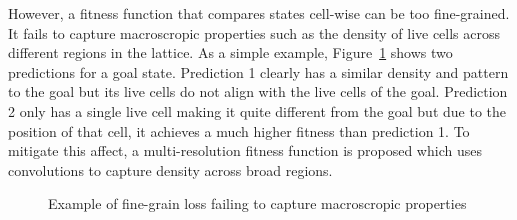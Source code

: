However, a fitness function that compares states cell-wise can be too fine-grained. It fails to capture macroscropic properties such as the density of live cells across different regions in the lattice. As a simple example, Figure~\ref{fig:singleres-fail} shows two predictions for a goal state. Prediction 1 clearly has a similar density and pattern to the goal but its live cells do not align with the live cells of the goal. Prediction 2 only has a single live cell making it quite different from the goal but due to the position of that cell, it achieves a much higher fitness than prediction 1. To mitigate this affect, a multi-resolution fitness function is proposed which uses convolutions to capture density across broad regions.\\

\begin{figure}[!h]
\centering
            \hfill
            \hfill
            \hfill
            \caption{Example of fine-grain loss failing to capture macroscropic properties}
\label{fig:singleres-fail}
\end{figure}

